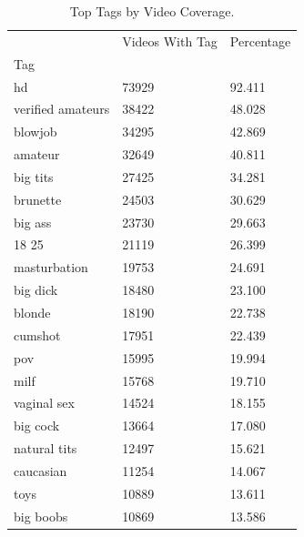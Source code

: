 \begin{table}[htbp]
\centering
\caption{Top Tags by Video Coverage.}
\label{tab:eda_top_tags}
\begin{tabular}{lll}
\toprule
 & Videos With Tag & Percentage \\
Tag &  &  \\
\midrule
hd & 73929 & 92.411 \\
verified amateurs & 38422 & 48.028 \\
blowjob & 34295 & 42.869 \\
amateur & 32649 & 40.811 \\
big tits & 27425 & 34.281 \\
brunette & 24503 & 30.629 \\
big ass & 23730 & 29.663 \\
18 25 & 21119 & 26.399 \\
masturbation & 19753 & 24.691 \\
big dick & 18480 & 23.100 \\
blonde & 18190 & 22.738 \\
cumshot & 17951 & 22.439 \\
pov & 15995 & 19.994 \\
milf & 15768 & 19.710 \\
vaginal sex & 14524 & 18.155 \\
big cock & 13664 & 17.080 \\
natural tits & 12497 & 15.621 \\
caucasian & 11254 & 14.067 \\
toys & 10889 & 13.611 \\
big boobs & 10869 & 13.586 \\
\bottomrule
\end{tabular}

\end{table}